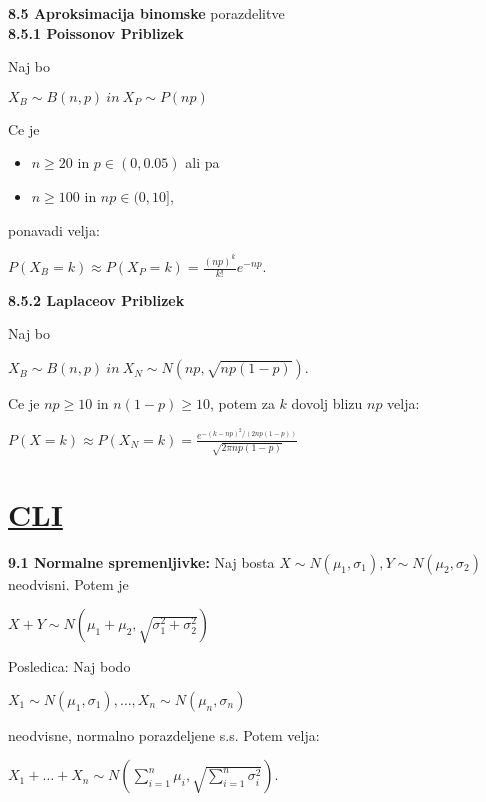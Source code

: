 \documentclass{article}
\begin{document}
\begin{multicols}{2}
	\textbf{8.5 Aproksimacija binomske} porazdelitve\\

	\textbf{8.5.1 Poissonov Priblizek}

	Naj bo
	\begin{center}
		\begin{math}
			X_B \sim B(n, p)\: in\: X_P \sim P(np)
		\end{math}
	\end{center}
	Ce je
	\begin{itemize}
		\item $n \geq 20$ in $p \in (0, 0.05)$ ali pa
		\item $n \geq 100$ in $np \in (0, 10]$,
	\end{itemize}
	ponavadi velja:
	\begin{center}
		\begin{math}
			P(X_B = k) \approx P(X_P = k) = \frac{(np)^k}{k!} e^{-np}
		\end{math}.
	\end{center}

	\textbf{8.5.2 Laplaceov Priblizek}

	Naj bo
	\begin{center}
		\begin{math}
			X_B \sim B(n, p)\: in\: X_N \sim N(np, \sqrt{np(1-p)})
		\end{math}.
	\end{center}
	Ce je $np \geq 10$ in $n(1 - p) \geq 10$, potem za $k$ dovolj blizu $np$ velja:
	\begin{center}
		\begin{math}
			P(X = k) \approx P(X_N = k) =
			\frac{
				e^{-(k - np)^2/ (2np(1 - p))}
			}{\sqrt{2 \pi np(1 - p)}}
		\end{math}
	\end{center}

	\section{\underline{CLI}}

	\textbf{9.1 Normalne spremenljivke:} Naj bosta $X \sim N(\mu_1, \sigma_1), Y \sim N(\mu_2, \sigma_2)$ neodvisni.
	Potem je
	\begin{center}
		\begin{math}
			X + Y \sim N(\mu_1 + \mu_2, \sqrt{\sigma_1^2 + \sigma_2^2})
		\end{math}
	\end{center}
	Posledica: Naj bodo
	\begin{center}
		\begin{math}
			X_1 \sim N(\mu_1, \sigma_1), \dots , X_n \sim  N(\mu_n, \sigma_n)
		\end{math}
	\end{center}
	neodvisne, normalno porazdeljene s.s. Potem velja:
	\begin{center}
		\begin{math}
			X_1 + \dots + X_n \sim N (
			\sum_{i=1}^{n} \mu_i, \sqrt{\sum_{i=1}^{n} \sigma_i^2}
			)
		\end{math}.
	\end{center}


\end{multicols}
\end{document}
